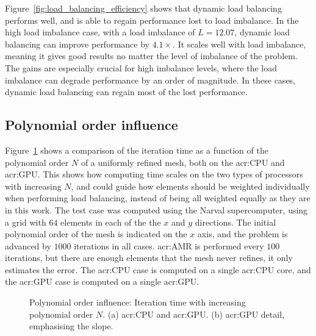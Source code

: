 Figure~\ref{fig:load_balancing_efficiency} shows that dynamic load balancing performs well, and is
able to regain performance lost to load imbalance. In the high load imbalance case, with a load
imbalance of \(L = 12.07\), dynamic load balancing can improve performance by \(4.1 \times \). It
scales well with load imbalance, meaning it gives good results no matter the level of imbalance of
the problem. The gains are especially crucial for high imbalance levels, where the load imbalance
can degrade performance by an order of magnitude. In these cases, dynamic load balancing can regain
most of the lost performance.

\subsection{Polynomial order influence}\label{subsection:results:load_balancing_performance:polynomial_order}

Figure~\ref{fig:N_influence} shows a comparison of the iteration time as a function of the
polynomial order \(N\) of a uniformly refined mesh, both on the \acrshort{acr:CPU} and
\acrshort{acr:GPU}. This shows how computing time scales on the two types of processors with
increasing \(N\), and could guide how elements should be weighted individually when performing load
balancing, instead of being all weighted equally as they are in this work. The test case was
computed using the Narval supercomputer, using a grid with \(64\) elements in each of the the \(x\)
and \(y\) directions. The initial polynomial order of the mesh is indicated on the \(x\) axis, and
the problem is advanced by \(1000\) iterations in all cases. \Acrshort{acr:AMR} is performed every
\(100\) iterations, but there are enough elements that the mesh never refines, it only estimates the
error. The \acrshort{acr:CPU} case is computed on a single \acrshort{acr:CPU} core, and the
\acrshort{acr:GPU} case is computed on a single \acrshort{acr:GPU}.

\begin{figure}[H]
    \centering
    \hfill
    \caption{Polynomial order influence: Iteration time with increasing polynomial order \(N\). (a)
        \Acrshort{acr:CPU} and \Acrshort{acr:GPU}. (b) \Acrshort{acr:GPU} detail, emphasising the
        slope.}\label{fig:N_influence}
\end{figure}


